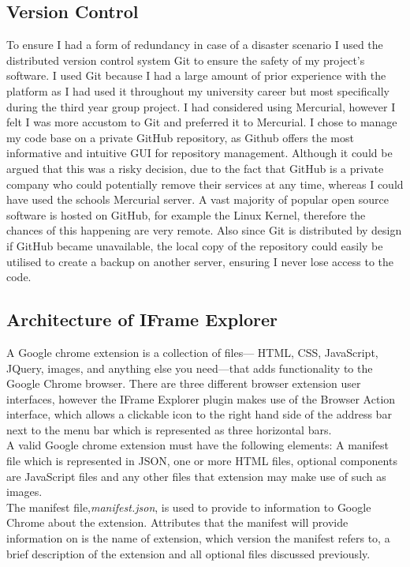 \documentclass[12pt]{article}
\begin{document}
\subsection{Version Control}
To ensure I had a form of redundancy in case of a disaster scenario I used the distributed version control system Git to ensure the safety of my project's software. I used Git because I had a large amount of prior experience with the platform as I had used it throughout my university career but most specifically during the third year group project. I had considered using Mercurial, however I felt I was more accustom to Git and preferred it to Mercurial. I chose to manage my code base on a private GitHub repository, as Github offers the most informative and intuitive GUI for repository management. Although it could be argued that this was a risky decision, due to the fact that GitHub is a private company who could potentially remove their services at any time, whereas I could have used the schools Mercurial server. A vast majority of popular open source software is hosted on GitHub, for example the Linux Kernel, therefore the chances of this happening are very remote.  Also since Git is distributed by design if GitHub became unavailable, the local copy of the repository could easily be utilised to create a backup on another server, ensuring I never lose access to the code.

\subsection{Architecture of IFrame Explorer}
A Google chrome extension is a collection of files— HTML, CSS, JavaScript, JQuery, images, and anything else you need—that adds functionality to the Google Chrome browser. There are three different browser extension user interfaces, however the IFrame Explorer plugin makes use of the Browser Action interface, which allows a clickable icon to the right hand side of the address bar next to the menu bar which is represented as three horizontal bars. \\

A valid Google chrome extension must have the following elements: A manifest file which is represented in JSON, one or more HTML files, optional components are JavaScript files and any other files that extension may make use of such as images. \\

The manifest file,\textit{manifest.json}, is used to provide to information to Google Chrome about the extension. Attributes that the manifest will provide information on is the name of extension, which version the manifest refers to, a brief description of the extension and all optional files discussed previously. \\
\end{document}
